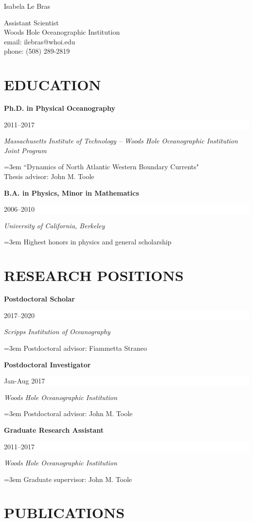 \documentclass[paper=letter,fontsize=11pt]{scrartcl} %
\newcommand{\sepspace}{\vspace*{3mm}}		%
\newcommand{\MyName}[1]{ %
		\huge  \textbf \hfill #1 %
		\par \normalsize \normalfont}
\newcommand{\MySlogan}[1]{ %
		\large \hfill #1 %
		\par \normalsize \normalfont}
\newcommand{\NewPart}[2]{\section*{\uppercase{#1} #2}}
\newcommand{\EducationEntry}[4]{
		\noindent \textbf{#1} \hfill      %
		\colorbox{White}{%
			\parbox{8em}{%
			\hfill\color{Black}#2}} \par  %
		\noindent \textit{#3} \par        %
		\noindent\hangindent=3em\hangafter=0 #4 %
		 \par}
\begin{document}


\MyName{Isabela Le Bras}
\MySlogan{\vspace{-0.3in}\begin{flushright}Assistant Scientist\\
Woods Hole Oceanographic Institution\\
email: ilebras@whoi.edu\\
phone: (508) 289-2819\\
\end{flushright}}


\NewPart{Education}{}

\EducationEntry{Ph.D. in Physical Oceanography}{2011--2017}{Massachusetts Institute of Technology -- Woods Hole Oceanographic Institution Joint Program}{``Dynamics of North Atlantic Western Boundary Currents"\\
Thesis advisor: John M. Toole}
\sepspace

\EducationEntry{B.A. in Physics, Minor in Mathematics}{2006--2010}{University of California, Berkeley}{Highest honors in physics and general scholarship}

\NewPart{Research Positions}{}

\EducationEntry{{Postdoctoral Scholar}}{2017--2020}{Scripps Institution of Oceanography}{Postdoctoral advisor: Fiammetta Straneo}

\sepspace

\EducationEntry{Postdoctoral Investigator}{Jan-Aug 2017}{Woods Hole Oceanographic Institution}
{Postdoctoral advisor: John M. Toole}

\sepspace

\EducationEntry{Graduate Research Assistant}{2011--2017}{Woods Hole Oceanographic Institution}
{Graduate supervisor: John M. Toole}



\NewPart{Publications}{}
\end{document}
